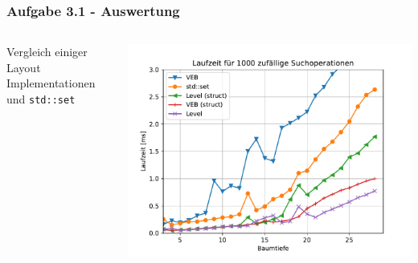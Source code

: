 \documentclass[aspectratio=169]{beamer}
\begin{document}
\begin{frame}
	\frametitle{Aufgabe 3.1 - Auswertung}
	\begin{columns}[c] %
		
		Vergleich einiger Layout Implementationen und \texttt{std::set}
		
		\includegraphics[scale=.6]{struct_comp.pdf}
		
		
	\end{columns}
	\end{frame}
	
\end{document}
